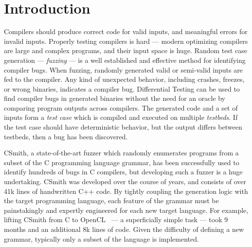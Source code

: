 \section{Introduction}\label{sec:intro}

\noindent
Compilers should produce correct code for valid inputs, and meaningful errors for invalid inputs. Properly testing compilers is hard --- modern optimizing compilers are large and complex programs, and their input space is huge. Random test case generation --- \emph{fuzzing} --- is a well established and effective method for identifying compiler bugs. When fuzzing, randomly generated valid or semi-valid inputs are fed to the compiler. Any kind of unexpected behavior, including crashes, freezes, or wrong binaries, indicates a compiler bug. Differential Testing can be used to find compiler bugs in generated binaries without the need for an oracle by comparing program outputs across compilers. The generated code and a set of inputs form a \emph{test case} which is compiled and executed on multiple \emph{testbeds}. If the test case should have deterministic behavior, but the output differs between testbeds, then a bug has been discovered.

CSmith, a state-of-the-art fuzzer which randomly enumerates programs from a subset of the C programming language grammar, has been successfully used to identify hundreds of bugs in C compilers, but developing such a fuzzer is a huge undertaking. CSmith was developed over the course of years, and consists of over 41k lines of handwritten C++ code. By tightly coupling the generation logic with the target programming language, each feature of the grammar must be painstakingly and expertly engineered for each new target language. For example, lifting CSmith from C to OpenCL~\cite{Lidbury2015a} --- a superficially simple task --- took 9 months and an additional 8k lines of code. Given the difficulty of defining a new grammar, typically only a subset of the language is implemented. 

